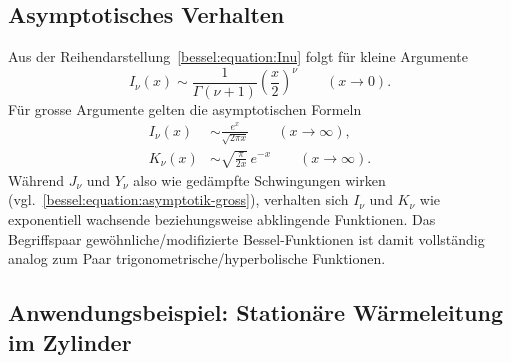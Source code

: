 \subsection{Asymptotisches Verhalten
\label{bessel:subsection:mod-asymptotik}}

Aus der Reihendarstellung~\eqref{bessel:equation:Inu} folgt für kleine Argumente
\begin{equation}
I_\nu(x)
\sim
\frac{1}{\Gamma(\nu+1)}\left(\frac{x}{2}\right)^\nu
\qquad (x \to 0).
\label{bessel:equation:Inu-klein}
\end{equation}
Für grosse Argumente gelten die asymptotischen Formeln
\begin{align}
I_\nu(x) &\sim \frac{e^x}{\sqrt{2\pi x}}
\qquad (x \to \infty),
\label{bessel:equation:Inu-gross} \\
K_\nu(x) &\sim \sqrt{\frac{\pi}{2x}}\, e^{-x}
\qquad (x \to \infty).
\label{bessel:equation:Knu-gross}
\end{align}
Während $J_\nu$ und $Y_\nu$ also wie gedämpfte Schwingungen wirken (vgl.~\eqref{bessel:equation:asymptotik-gross}), verhalten sich $I_\nu$ und $K_\nu$ wie exponentiell wachsende beziehungsweise abklingende Funktionen.
Das Begriffspaar gewöhnliche/modifizierte Bessel-Funktionen ist damit vollständig analog zum Paar trigonometrische/hyperbolische Funktionen.

\subsection{Anwendungsbeispiel: Stationäre Wärmeleitung im Zylinder
\label{bessel:subsection:mod-anwendung}}
%


